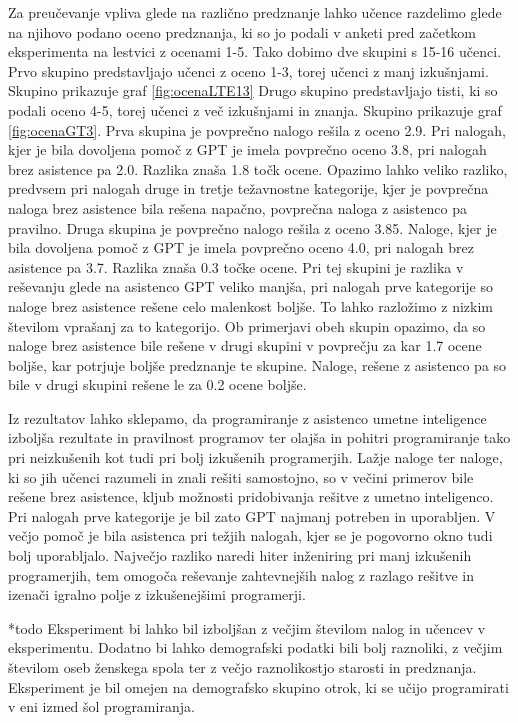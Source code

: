 \documentclass[a4paper,12pt,openright]{book}
\begin{document}
Za preučevanje vpliva glede na različno predznanje lahko učence razdelimo glede na njihovo podano oceno predznanja, ki so jo podali v anketi pred začetkom eksperimenta na lestvici z ocenami 1-5. Tako dobimo dve skupini s 15-16 učenci. Prvo skupino predstavljajo učenci z oceno 1-3, torej učenci z manj izkušnjami. Skupino prikazuje graf \ref{fig:ocenaLTE13} Drugo skupino predstavljajo tisti, ki so podali oceno 4-5, torej učenci z več izkušnjami in znanja. Skupino prikazuje graf \ref{fig:ocenaGT3}.
Prva skupina je povprečno nalogo rešila z oceno 2.9. Pri nalogah, kjer je bila dovoljena pomoč z GPT je imela povprečno oceno 3.8, pri nalogah brez asistence pa 2.0. Razlika znaša 1.8 točk ocene. Opazimo lahko veliko razliko, predvsem pri nalogah druge in tretje težavnostne kategorije, kjer je povprečna naloga brez asistence bila rešena napačno, povprečna naloga z asistenco pa pravilno.
Druga skupina je povprečno nalogo rešila z oceno 3.85. Naloge, kjer je bila dovoljena pomoč z GPT je imela povprečno oceno 4.0, pri nalogah brez asistence pa 3.7. Razlika znaša 0.3 točke ocene. Pri tej skupini je razlika v reševanju glede na asistenco GPT veliko manjša, pri nalogah prve kategorije so naloge brez asistence rešene celo malenkost boljše. To lahko razložimo z nizkim številom vprašanj za to kategorijo.
Ob primerjavi obeh skupin opazimo, da so naloge brez asistence bile rešene v drugi skupini v povprečju za kar 1.7 ocene boljše, kar potrjuje boljše predznanje te skupine. Naloge, rešene z asistenco pa so bile v drugi skupini rešene le za 0.2 ocene boljše.

Iz rezultatov lahko sklepamo, da programiranje z asistenco umetne inteligence izboljša rezultate in pravilnost programov ter olajša in pohitri programiranje tako pri neizkušenih kot tudi pri bolj izkušenih programerjih. Lažje naloge ter naloge, ki so jih učenci razumeli in znali rešiti samostojno, so v večini primerov bile rešene brez asistence, kljub možnosti pridobivanja rešitve z umetno inteligenco. Pri nalogah prve kategorije je bil zato GPT najmanj potreben in uporabljen. V večjo pomoč je bila asistenca pri težjih nalogah, kjer se je pogovorno okno tudi bolj uporabljalo. Največjo razliko naredi hiter inženiring pri manj izkušenih programerjih, tem omogoča reševanje zahtevnejših nalog z razlago rešitve in izenači igralno polje z izkušenejšimi programerji.


*todo
Eksperiment bi lahko bil izboljšan z večjim številom nalog in učencev v eksperimentu. Dodatno bi lahko demografski podatki bili bolj raznoliki, z večjim številom oseb ženskega spola ter z večjo raznolikostjo starosti in predznanja. Eksperiment je bil omejen na demografsko skupino otrok, ki se učijo programirati v eni izmed šol programiranja.

\printbibliography[heading=bibintoc,title={Literatura}]
\end{document}
